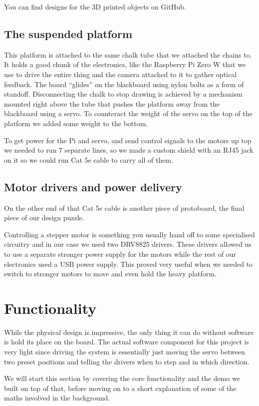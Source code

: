 \documentclass[12pt]{article}
\begin{document}
You can find designs for the 3D printed objects on GitHub\cite{github}.

\subsection*{The suspended platform}
This platform is attached to the same chalk tube that we attached
the chains to.
It holds a good chunk of the electronics, like the Raspberry Pi Zero W
that we use to drive the entire thing and the camera attached to it
to gather optical feedback.
The board ``glides'' on the blackboard using nylon bolts as a form of
standoff.
Disconnecting the chalk to stop drawing is achieved by a mechanism
mounted right above the tube that pushes the platform away from the
blackboard using a servo.
To counteract the weight of the servo on the top of the platform
we added some weight to the bottom.

To get power for the Pi and servo, and send control signals to the
motors up top we needed to run 7 separate lines, so we made a
custom shield with an RJ45 jack on it so we could run Cat 5e
cable to carry all of them.

\subsection*{Motor drivers and power delivery}
On the other end of that Cat 5e cable is another piece of protoboard,
the final piece of our design puzzle.

Controlling a stepper motor is something you usually hand off to some
specialised circuitry and in our case we used two DRV8825 drivers.
These drivers allowed us to use a separate stronger power supply for
the motors while the rest of our electronics used a USB power supply.
This proved very useful when we needed to switch to stronger motors
to move and even hold the heavy platform.


\section{Functionality}
\label{sec:functionality}
While the physical design is impressive, the only thing it can do
without software is hold its place on the board.
The actual software component for this project is very light since
driving the system is essentially just moving the servo between
two preset positions and telling the drivers when to step and in
which direction.

We will start this section by covering the core functionality and the
demo we built on top of that, before moving on to a short explanation
of some of the maths involved in the background.
\end{document}
